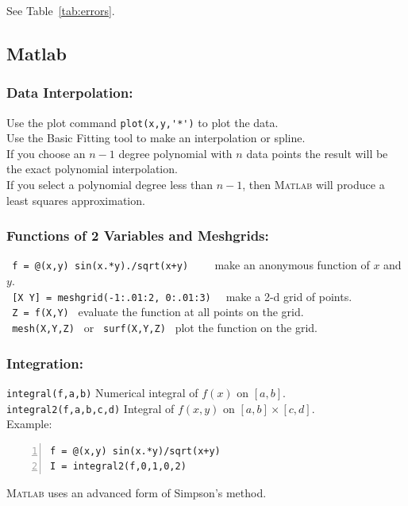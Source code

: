 See Table~\ref{tab:errors}.

\subsection*{Matlab}
\subsubsection*{Data Interpolation:}
Use the plot command \verb&plot(x,y,'*')& to plot
the data.\\
Use the Basic Fitting tool to make an interpolation or spline.\\
If you choose an $n-1$ degree polynomial with $n$ data
points the result will be the exact polynomial interpolation.\\
If you select a polynomial degree less than $n-1$, then \textsc{Matlab}
will produce a least squares approximation.

\subsubsection*{Functions of 2 Variables and Meshgrids:}
\verb& f = @(x,y) sin(x.*y)./sqrt(x+y)    &  \dotfill make an anonymous function of $x$ and $y$.\\
\verb& [X Y] = meshgrid(-1:.01:2, 0:.01:3)  & \dotfill make a 2-d grid of points.\\
\verb& Z = f(X,Y) & \dotfill evaluate the function at all points on the grid.\\
\verb& mesh(X,Y,Z) & or \verb& surf(X,Y,Z) &  \dotfill plot the function on the grid.


\subsubsection*{Integration:}
\verb&integral(f,a,b)& \dotfill Numerical integral of $f(x)$ on $[a,b]$.\\
\verb&integral2(f,a,b,c,d)& \dotfill Integral of $f(x,y)$ on $[a,b]\times[c,d]$.\\
Example:
\begin{lstlisting}[frame=none,numbers=left]
f = @(x,y) sin(x.*y)/sqrt(x+y)
I = integral2(f,0,1,0,2)
\end{lstlisting}
\textsc{Matlab} uses an advanced form of Simpson's method.

